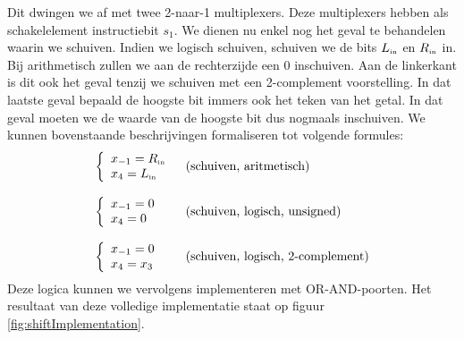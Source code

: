 Dit dwingen we af met twee 2-naar-1 multiplexers. Deze multiplexers hebben als schakelelement instructiebit $s_1$. We dienen nu enkel nog het geval te behandelen waarin we schuiven. Indien we logisch schuiven, schuiven we de bits $L_{\mbox{\tiny{in}}}$ en $R_{\mbox{\tiny{in}}}$ in. Bij arithmetisch zullen we aan de rechterzijde een 0 inschuiven. Aan de linkerkant is dit ook het geval tenzij we schuiven met een 2-complement voorstelling. In dat laatste geval bepaald de hoogste bit immers ook het teken van het getal. In dat geval moeten we de waarde van de hoogste bit dus nogmaals inschuiven. We kunnen bovenstaande beschrijvingen formaliseren tot volgende formules:
\begin{equation}
\begin{array}{ll}
\left\{\begin{array}{l}
x_{-1}=R_{\mbox{\tiny{in}}}\\
x_4=L_{\mbox{\tiny{in}}}
\end{array}\right.&\mbox{(schuiven, aritmetisch)}\\\\\left\{\begin{array}{l}
x_{-1}=0\\
x_4=0
\end{array}\right.&\mbox{(schuiven, logisch, unsigned)}\\\\\left\{\begin{array}{l}
x_{-1}=0\\
x_4=x_3
\end{array}\right.&\mbox{(schuiven, logisch, 2-complement)}
\end{array}
\end{equation}
Deze logica kunnen we vervolgens implementeren met OR-AND-poorten. Het resultaat van deze volledige implementatie staat op figuur \ref{fig:shiftImplementation}.
